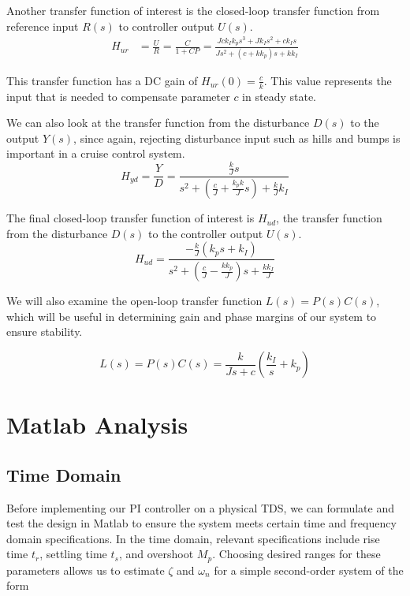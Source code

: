 \documentclass[11pt,titlepage]{article}
\begin{document}
	Another transfer function of interest is the closed-loop transfer function from reference input $R(s)$ to controller output $U(s)$.
	\begin{align}
		H_{ur}&=\frac{U}{R}=\frac{C}{1+CP}=\frac{Jck_Ik_ps^3+Jk_Is^2+ck_Is}{Js^2+(c+kk_p)s+kk_I}
	\end{align}
	
	This transfer function has a DC gain of  $H_{ur}(0)=\frac{c}{k}$. This value represents the input that is needed to compensate parameter $c$ in steady state. 
		
	We can also look at the transfer function from the disturbance $D(s)$ to the output $Y(s)$, since again, rejecting disturbance input such as hills and bumps is important in a cruise control system.
	\begin{equation}
		H_{yd}=\frac{Y}{D}=\frac{\frac{k}{J}s}{s^2+(\frac{c}{J}+\frac{k_pk}{J}s)+\frac{k}{J}k_I}
	\end{equation}
	
	The final closed-loop transfer function of interest is $H_{ud}$, the transfer function from the disturbance $D(s)$ to the controller output $U(s)$. 
	\begin{equation}
		H_{ud}=\frac{-\frac{k}{J}(k_ps+k_I)}{s^2+(\frac{c}{J}-\frac{kk_p}{J})s+\frac{kk_I}{J}}
	\end{equation}	
		
	We will also examine the open-loop transfer function $L(s)=P(s)C(s)$, which will be useful in determining gain and phase margins of our system to ensure stability.
	
	\begin{equation}
		L(s)=P(s)C(s)=	\frac{k}{Js+c}(\frac{k_I}{s}+k_p)
		\end{equation}


\section{Matlab Analysis}\label{sec:mat_anys}
    \subsection{Time Domain}
	    Before implementing our PI controller on a physical TDS, we can formulate and test the design in Matlab to ensure the system meets certain time and frequency domain specifications. In the time domain, relevant specifications include rise time $t_r$, settling time $t_s$, and overshoot $M_p$. Choosing desired ranges for these parameters allows us to estimate $\zeta$ and $\omega_{n}$ for a simple second-order system of the form
	    
\end{document}
